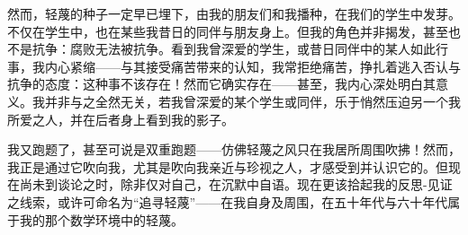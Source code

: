 然而，轻蔑的种子一定早已埋下，由我的朋友们和我播种，在我们的学生中发芽。不仅在学生中，也在某些我昔日的同伴与朋友身上。但我的角色并非揭发，甚至也不是抗争：腐败无法被抗争。看到我曾深爱的学生，或昔日同伴中的某人如此行事，我内心紧缩——与其接受痛苦带来的认知，我常拒绝痛苦，挣扎着逃入否认与抗争的态度：这种事不该存在！然而它确实存在——甚至，我内心深处明白其意义。我并非与之全然无关，若我曾深爱的某个学生或同伴，乐于悄然压迫另一个我所爱之人，并在后者身上看到我的影子。

我又跑题了，甚至可说是双重跑题——仿佛轻蔑之风只在我居所周围吹拂！然而，我正是通过它吹向我，尤其是吹向我亲近与珍视之人，才感受到并认识它的。但现在尚未到谈论之时，除非仅对自己，在沉默中自语。现在更该拾起我的反思-见证之线索，或许可命名为“追寻轻蔑”——在我自身及周围，在五十年代与六十年代属于我的那个数学环境中的轻蔑。